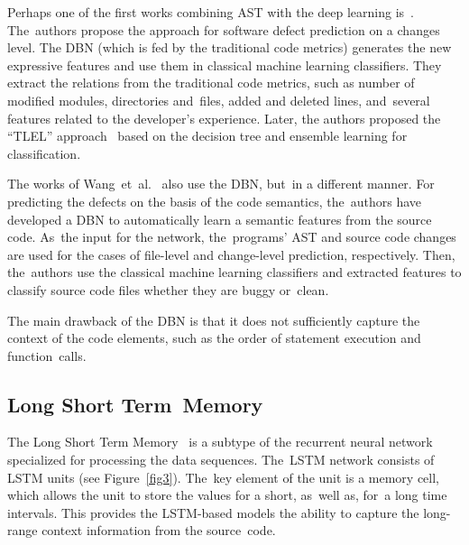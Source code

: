 \documentclass[mathematics,review,accept,moreauthors,pdftex]{Definitions/mdpi}
\begin{document}
Perhaps one of the first works combining AST with the deep learning is~\cite{YangEtAl2015}. The~authors propose the approach for software defect prediction on a changes level. 
The DBN (which is fed by the traditional code metrics) generates the new expressive features and use them in classical machine learning classifiers. 
They extract the relations from the traditional code metrics, such as number of modified modules, directories and~files, added and deleted lines, and~several features related to the developer's experience. Later, the authors proposed the ``TLEL'' approach~\cite{YangEtAl2017} based on the decision tree and ensemble learning for classification. %

The works of Wang~et~al.~\cite{WangEtAl2016, WangEtAl2018} also use the DBN, but~in a different manner.
For predicting the defects on the basis of the code semantics, the~authors have developed a DBN to automatically learn a semantic features from the source code. As~the input for the network, the~programs' AST and source code changes are used for the cases of file-level and change-level prediction, respectively. 
Then, the~authors use the classical machine learning classifiers and extracted features to classify source code files whether they are buggy or~clean.

The main drawback of the DBN is that it does not sufficiently capture the context of the code elements, such as the order of statement execution and function~calls.

\subsection{Long Short Term~Memory}

The Long Short Term Memory~\cite{Hochreiter1997lstm} is a subtype of the recurrent neural network specialized for processing the data sequences. The~LSTM network consists of LSTM units (see Figure~\ref{fig3}). The~key element of the unit is a memory cell, which allows the unit to store the values for a short, as~well as, for~a long time intervals. This provides the LSTM-based models the ability to capture the long-range context information from the source~code.
\end{document}
